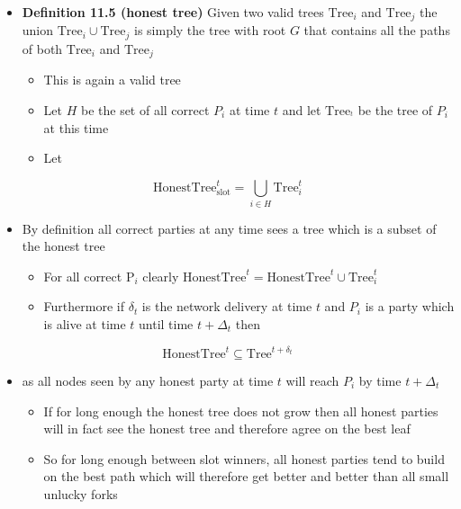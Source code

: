 \documentclass[11pt]{article}
\begin{document}
\begin{itemize}
\item \textbf{Definition 11.5 (honest tree)} Given two valid trees \(\text{Tree}_i\) and \(\text{Tree}_j\)  the union \(\text{Tree}_i \cup \text{Tree}_j\) is simply the tree with root \(G\) that contains all the paths of both  \(\text{Tree}_i\) and \(\text{Tree}_j\)
\begin{itemize}
\item This is again a valid tree
\item Let \(H\) be the set of all correct \(P_i\) at time \(t\) and let \(\text{Tree}_^t\) be the tree of \(P_i\) at this time
\item Let
\end{itemize}
\end{itemize}
\begin{equation}
  \text{HonestTree}^t_\text{slot} = \bigcup_{i\in H} \text{Tree}_i^t
\end{equation}
\begin{itemize}
\item By definition all correct parties at any time sees a tree which is a subset of the honest tree
\begin{itemize}
\item For all correct \(\text{P}_i\) clearly \(\text{HonestTree}^t = \text{HonestTree}^t \cup \text{Tree}^t_i\)
\item Furthermore if \(\delta_t\) is the network delivery at time \(t\) and \(P_i\) is a party which is alive at time \(t\) until time \(t+\Delta_t\) then
\end{itemize}
\end{itemize}
\begin{equation}
  \text{HonestTree}^t \subseteq \text{Tree}^{t+\delta_t}
\end{equation}
\begin{itemize}
\item as all nodes seen by any honest party at time \(t\) will reach \(P_i\) by time \(t+ \Delta_t\)
\begin{itemize}
\item If for long enough the honest tree does not grow then all honest parties will in fact see the honest tree and therefore agree on the best leaf
\item So for long enough between slot winners, all honest parties tend to build on the best path which will therefore get better and better than all small unlucky forks
\end{itemize}
\end{itemize}
\end{document}
